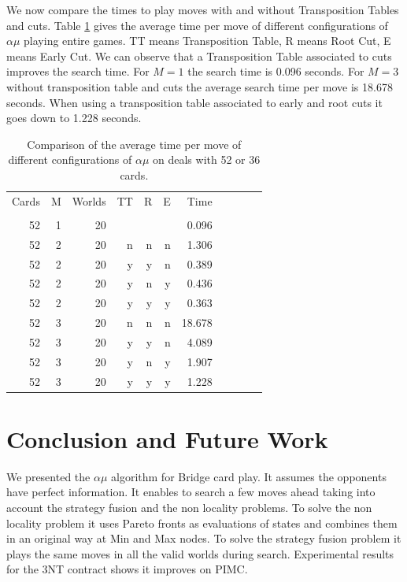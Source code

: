 \documentclass{ecai}
\begin{document}
We now compare the times to play moves with and without Transposition
Tables and cuts. Table \ref{table13cardsTime} gives the average time
per move of different configurations of $\alpha\mu$ playing entire
games. TT means Transposition Table, R means Root Cut, E means Early
Cut. We can observe that a Transposition Table associated to cuts
improves the search time. For $M=1$ the search time is 0.096
seconds. For $M=3$ without transposition table and cuts the average
search time per move is 18.678 seconds. When using a transposition
table associated to early and root cuts it goes down to 1.228 seconds.

\begin{table}
  \centering
  \caption{Comparison of the average time per move of different
  configurations of $\alpha\mu$ on deals with 52 or 36 cards.}
  \label{table13cardsTime}
  \begin{tabular}{rrrrrrrrrrr}
Cards & M & Worlds & TT & R & E &   Time\\
      &   &        &    &   &   &       \\
   52 & 1 &     20 &    &   &   &  0.096\\
   52 & 2 &     20 &  n & n & n &  1.306\\
   52 & 2 &     20 &  y & y & n &  0.389\\
   52 & 2 &     20 &  y & n & y &  0.436\\
   52 & 2 &     20 &  y & y & y &  0.363\\
   52 & 3 &     20 &  n & n & n & 18.678\\
   52 & 3 &     20 &  y & y & n &  4.089\\
   52 & 3 &     20 &  y & n & y &  1.907\\
   52 & 3 &     20 &  y & y & y &  1.228\\
  \end{tabular}
\end{table}

\section{Conclusion and Future Work}

We presented the $\alpha\mu$ algorithm for Bridge card play. It
assumes the opponents have perfect information. It enables to search a
few moves ahead taking into account the strategy fusion and the non
locality problems. To solve the non locality problem it uses Pareto
fronts as evaluations of states and combines them in an original way
at Min and Max nodes. To solve the strategy fusion problem it plays
the same moves in all the valid worlds during search. Experimental
results for the 3NT contract shows it improves on PIMC.
\end{document}
